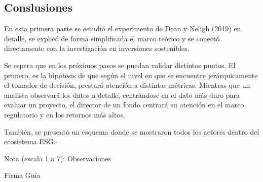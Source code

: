 \documentclass[11pt,letterpaper]{article}
\begin{document}
\begin{enumerate}
\section{Conslusiones}

En esta primera parte se estudió el experimento de Dean y Neligh (2019) en detalle, se explicó de forma simplificada el marco teórico y se conectó directamente con la investigación en inversiones sostenibles. 

Se espera que en los próximos pasos se puedan validar distintos puntos. El primero, es la hipótesis de que según el nivel en que se encuentre jerárquicamente el tomador de decisión, prestará atención a distintas métricas. Mientras que un analista observará los datos a detalle, centrándose en el dato más duro para evaluar un proyecto, el director de un fondo centrará su atención en el marco regulatorio y en los retornos más altos.

También, se presentó un esquema donde se mostraron todos los actores dentro del ecosistema ESG.


\vspace{3cm}


Nota (escala 1 a 7): 
\vspace{3cm}
Observaciones



\centering Firma Guía



    
\end{enumerate}





\newpage











































\end{document}
